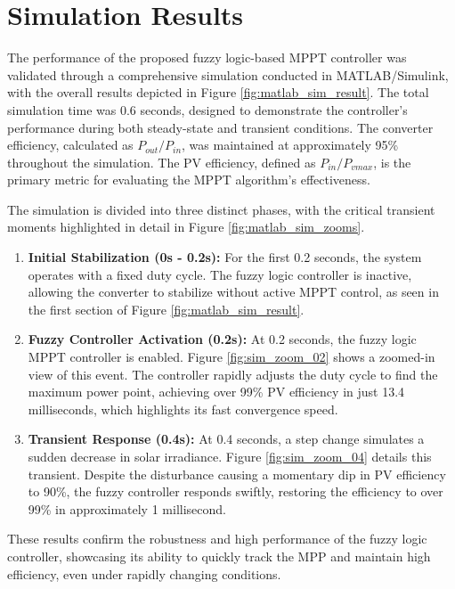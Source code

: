 \documentclass[a4paper,oneside,12pt]{report}
\numberwithin{equation}{chapter}
\begin{document}
\section{Simulation Results}
\label{sec:matlab_sim_results}
The performance of the proposed fuzzy logic-based MPPT controller was validated through a comprehensive simulation conducted in MATLAB/Simulink, with the overall results depicted in Figure \ref{fig:matlab_sim_result}. The total simulation time was 0.6 seconds, designed to demonstrate the controller's performance during both steady-state and transient conditions. The converter efficiency, calculated as $P_{out}/P_{in}$, was maintained at approximately 95\% throughout the simulation. The PV efficiency, defined as $P_{in}/P_{vmax}$, is the primary metric for evaluating the MPPT algorithm's effectiveness.

The simulation is divided into three distinct phases, with the critical transient moments highlighted in detail in Figure \ref{fig:matlab_sim_zooms}.

\begin{enumerate}
    \item \textbf{Initial Stabilization (0s - 0.2s):} For the first 0.2 seconds, the system operates with a fixed duty cycle. The fuzzy logic controller is inactive, allowing the converter to stabilize without active MPPT control, as seen in the first section of Figure \ref{fig:matlab_sim_result}.

    \item \textbf{Fuzzy Controller Activation (0.2s):} At 0.2 seconds, the fuzzy logic MPPT controller is enabled. Figure \ref{fig:sim_zoom_02} shows a zoomed-in view of this event. The controller rapidly adjusts the duty cycle to find the maximum power point, achieving over 99\% PV efficiency in just 13.4 milliseconds, which highlights its fast convergence speed.

    \item \textbf{Transient Response (0.4s):} At 0.4 seconds, a step change simulates a sudden decrease in solar irradiance. Figure \ref{fig:sim_zoom_04} details this transient. Despite the disturbance causing a momentary dip in PV efficiency to 90\%, the fuzzy controller responds swiftly, restoring the efficiency to over 99\% in approximately 1 millisecond.
\end{enumerate}

These results confirm the robustness and high performance of the fuzzy logic controller, showcasing its ability to quickly track the MPP and maintain high efficiency, even under rapidly changing conditions.
\end{document}
